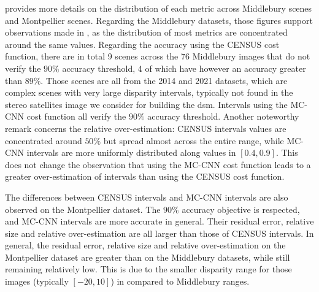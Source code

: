  provides more details on the distribution of each metric across Middlebury scenes and Montpellier scenes. Regarding the Middlebury datasets, those figures support observations made in , as the distribution of most metrics are concentrated around the same values. Regarding the accuracy using the CENSUS cost function, there are in total 9 scenes across the 76 Middlebury images that do not verify the $90\%$ accuracy threshold, 4 of which have however an accuracy greater than $89\%$. Those scenes are all from the 2014 and 2021 datasets, which are complex scenes with very large disparity intervals, typically not found in the stereo satellites image we consider for building the \acrshort{dsm}. Intervals using the MC-CNN cost function all verify the $90\%$ accuracy threshold. Another noteworthy remark concerns the relative over-estimation: CENSUS intervals values are concentrated around $50\%$ but spread almost across the entire range, while MC-CNN intervals are more uniformly distributed along values in $[0.4, 0.9]$. This does not change the observation that using the MC-CNN cost function leads to a greater over-estimation of intervals than using the CENSUS cost function. 

The differences between CENSUS intervals and MC-CNN intervals are also observed on the Montpellier dataset. The $90\%$ accuracy objective is respected, and MC-CNN intervals are more accurate in general. Their residual error, relative size and relative over-estimation are all larger than those of CENSUS intervals. In general, the residual error, relative size and relative over-estimation on the Montpellier dataset are greater than on the Middlebury datasets, while still remaining relatively low. This is due to the smaller disparity range for those images (typically $[-20, 10]$) in compared to Middlebury ranges. 

